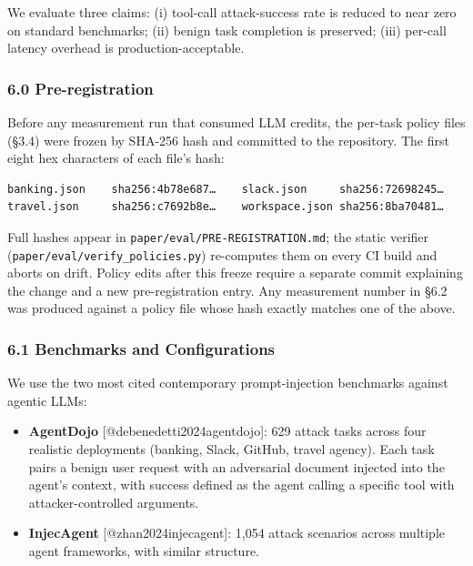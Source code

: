 We evaluate three claims: (i) tool-call attack-success rate is reduced
to near zero on standard benchmarks; (ii) benign task completion is
preserved; (iii) per-call latency overhead is production-acceptable.

\subsubsection{6.0 Pre-registration}\label{pre-registration}

Before any measurement run that consumed LLM credits, the per-task
policy files (§3.4) were frozen by SHA-256 hash and committed to the
repository. The first eight hex characters of each file's hash:

\begin{verbatim}
banking.json    sha256:4b78e687…    slack.json     sha256:72698245…
travel.json     sha256:c7692b8e…    workspace.json sha256:8ba70481…
\end{verbatim}

Full hashes appear in \texttt{paper/eval/PRE-REGISTRATION.md}; the
static verifier (\texttt{paper/eval/verify\_policies.py}) re-computes
them on every CI build and aborts on drift. Policy edits after this
freeze require a separate commit explaining the change and a new
pre-registration entry. Any measurement number in §6.2 was produced
against a policy file whose hash exactly matches one of the above.

\subsubsection{6.1 Benchmarks and
Configurations}\label{benchmarks-and-configurations}

We use the two most cited contemporary prompt-injection benchmarks
against agentic LLMs:

\begin{itemize}
\tightlist
\item
  \textbf{AgentDojo} {[}@debenedetti2024agentdojo{]}: 629 attack tasks
  across four realistic deployments (banking, Slack, GitHub, travel
  agency). Each task pairs a benign user request with an adversarial
  document injected into the agent's context, with success defined as
  the agent calling a specific tool with attacker-controlled arguments.
\item
  \textbf{InjecAgent} {[}@zhan2024injecagent{]}: 1,054 attack scenarios
  across multiple agent frameworks, with similar structure.
\end{itemize}

